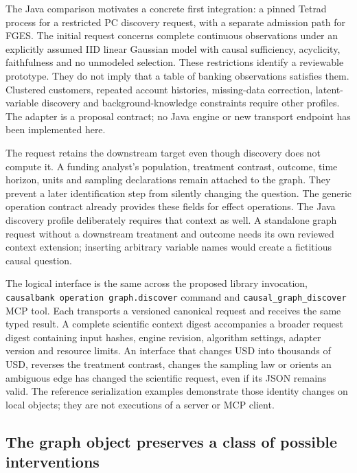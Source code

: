 \label{exec13:java-adapter}

The Java comparison motivates a concrete first integration: a pinned
Tetrad process for a restricted PC discovery request, with a separate
admission path for FGES. The initial request concerns complete
continuous observations under an explicitly assumed IID linear Gaussian
model with causal sufficiency, acyclicity, faithfulness and no unmodeled
selection. These restrictions identify a reviewable prototype. They do
not imply that a table of banking observations satisfies them. Clustered
customers, repeated account histories, missing-data correction,
latent-variable discovery and background-knowledge constraints require
other profiles. The adapter is a proposal contract; no Java engine or
new transport endpoint has been implemented here.
\citep{exec13_java_adapter_contract,exec13_java_tetrad}

The request retains the downstream target even though discovery does not
compute it. A funding analyst's population, treatment contrast, outcome,
time horizon, units and sampling declarations remain attached to the
graph. They prevent a later identification step from silently changing
the question. The generic operation contract already provides these
fields for effect operations. The Java discovery profile deliberately
requires that context as well. A standalone graph request without a
downstream treatment and outcome needs its own reviewed context
extension; inserting arbitrary variable names would create a fictitious
causal question. \citep{exec13_java_adapter_contract}

The logical interface is the same across the proposed library
invocation, \texttt{causalbank operation graph.discover} command and
\texttt{causal\_graph\_discover} MCP tool. Each transports a versioned
canonical request and receives the same typed result. A complete
scientific context digest accompanies a broader request digest
containing input hashes, engine revision, algorithm settings, adapter
version and resource limits. An interface that changes USD into
thousands of USD, reverses the treatment contrast, changes the sampling
law or orients an ambiguous edge has changed the scientific request,
even if its JSON remains valid. The reference serialization examples
demonstrate those identity changes on local objects; they are not
executions of a server or MCP client.
\citep{exec13_java_adapter_contract,exec13_java_adapter_oracles}

\hypertarget{the-graph-object-preserves-a-class-of-possible-interventions}{%
\subsection{The graph object preserves a class of possible
interventions}\label{the-graph-object-preserves-a-class-of-possible-interventions}}


